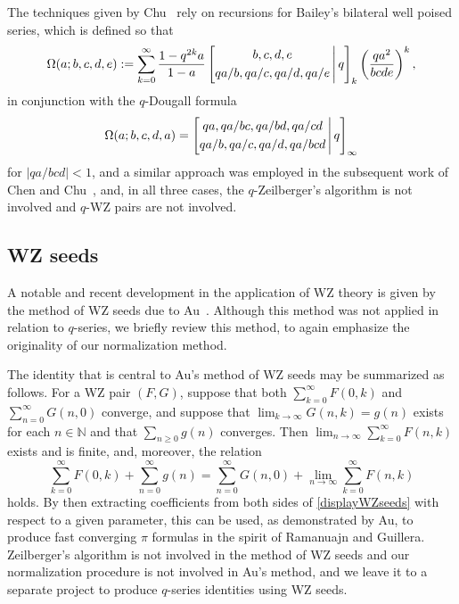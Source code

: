 \documentclass[12pt]{article}
\begin{document}
 The techniques given by Chu~\cite{Chu2018} rely on recursions 
 for Bailey's bilateral well poised series, which is defined so that 
 $$ \Omega(a; b, c, d, e) := \sum_{k=0}^{\infty} \frac{1-q^{2k}a}{1-a} 
 \left[ \begin{matrix} b, c, d, e \vspace{1mm} \\ 
 qa/b, qa/c, qa/d, qa/e \end{matrix} \, \Bigg| \, q \right]_{k} 
 \left( \frac{qa^2}{bcde} \right)^{k}, $$
 	 in conjunction with the $q$-Dougall formula 
\begin{equation*}
 \Omega(a; b, c, d, a) = 
 \left[ \begin{matrix} qa, qa/bc, qa/bd, qa/cd \vspace{1mm} \\ 
 qa/b, qa/c, qa/d, qa/bcd \end{matrix} \, \Bigg| \, q \right]_{\infty}
\end{equation*}
 for $|qa/bcd| < 1$, and a similar approach was employed in the 
 subsequent work of Chen and Chu~\cite{ChenChu2021IJNT,ChenChu2021RJ}, 
 and, in all three cases, the $q$-Zeilberger's algorithm is not involved and $q$-WZ pairs are not involved. 

\subsection{WZ seeds}
 A notable and recent development 
 in the application of WZ theory 
 is given by the method of WZ seeds due to Au~\cite{Au2025}. 
 Although this method was not applied in relation to $q$-series, 
 we briefly review this method, to again emphasize the originality of our normalization method. 

 The identity that is central to Au's method of WZ seeds 
 \cite{Au2025} may be summarized as follows. 
 For a WZ pair $(F, G)$, suppose that 
 both $\sum_{k=0}^{\infty} F(0, k)$ and $\sum_{n=0}^{\infty} G(n, 0)$ converge, 
 and suppose that 
 $\lim_{k \to \infty} G(n, k) = g(n)$ exists for each $n \in \mathbb{N}$
 and that $\sum_{n \geq 0} g(n)$ converges.
 Then $\lim_{n \to \infty} \sum_{k=0}^{\infty} F(n, k)$ exists and is finite, and, moreover, the relation 
\begin{equation}\label{displayWZseeds}
 \sum_{k=0}^{\infty} F(0, k) + \sum_{n=0}^{\infty} g(n) = \sum_{n=0}^{\infty} G(n, 0) 
 + \lim_{n \to \infty} \sum_{k = 0}^{\infty} F(n, k) 
\end{equation}
 holds. By then extracting coefficients from both sides of 
 \eqref{displayWZseeds} with respect to a given parameter, 
 this can be used, as demonstrated by Au, to produce fast converging $\pi$ formulas
 in the spirit of Ramanuajn and Guillera. 
 Zeilberger's algorithm is not involved in the method of WZ seeds 
 and our normalization procedure is not involved in Au's method, and we leave it to a separate project
 to produce $q$-series identities using WZ seeds. 
\end{document}
